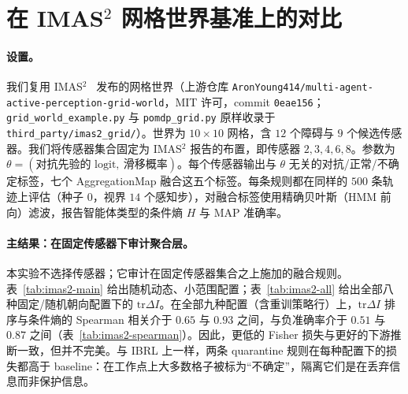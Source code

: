 \documentclass[11pt,a4paper]{article}
\begin{document}
\section{在 IMAS$^2$ 网格世界基准上的对比}
\label{sec:imas2-grid}

\paragraph{设置。}
我们复用 IMAS$^2$~\citep{shi2026imas2} 发布的网格世界（上游仓库 \texttt{AronYoung414/multi-agent-active-perception-grid-world}，MIT 许可，commit \texttt{0eae156}；\texttt{grid\_world\_example.py} 与 \texttt{pomdp\_grid.py} 原样收录于 \texttt{third\_party/imas2\_grid/}）。世界为 $10\times10$ 网格，含 $12$ 个障碍与 $9$ 个候选传感器。我们将传感器集合固定为 IMAS$^2$ 报告的布置，即传感器 $2,3,4,6,8$。参数为 $\theta=(\text{对抗先验的 logit},\ \text{滑移概率})$。每个传感器输出与 $\theta$ 无关的对抗/正常/不确定标签，七个 AggregationMap 融合这五个标签。每条规则都在同样的 $500$ 条轨迹上评估（种子 $0$，视界 $14$ 个感知步），对融合标签使用精确贝叶斯（HMM 前向）滤波，报告智能体类型的条件熵 $H$ 与 MAP 准确率。

\paragraph{主结果：在固定传感器下审计聚合层。}
本实验不选择传感器；它审计在固定传感器集合之上施加的融合规则。表~\ref{tab:imas2-main} 给出随机动态、小范围配置；表~\ref{tab:imas2-all} 给出全部八种固定/随机朝向配置下的 $\mathrm{tr}\Delta I$。在全部九种配置（含重训策略行）上，$\mathrm{tr}\Delta I$ 排序与条件熵的 Spearman 相关介于 $0.65$ 与 $0.93$ 之间，与负准确率介于 $0.51$ 与 $0.87$ 之间（表~\ref{tab:imas2-spearman}）。因此，更低的 Fisher 损失与更好的下游推断一致，但并不完美。与 IBRL 上一样，两条 quarantine 规则在每种配置下的损失都高于 baseline：在工作点上大多数格子被标为“不确定”，隔离它们是在丢弃信息而非保护信息。
\end{document}
